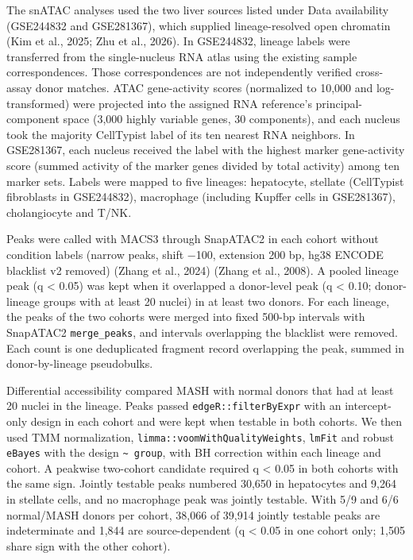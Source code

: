 The snATAC analyses used the two liver sources listed under Data availability (GSE244832 and GSE281367), which supplied lineage-resolved open chromatin (Kim et al., 2025; Zhu et al., 2026). In GSE244832, lineage labels were transferred from the single-nucleus RNA atlas using the existing sample correspondences. Those correspondences are not independently verified cross-assay donor matches. ATAC gene-activity scores (normalized to 10,000 and log-transformed) were projected into the assigned RNA reference's principal-component space (3,000 highly variable genes, 30 components), and each nucleus took the majority CellTypist label of its ten nearest RNA neighbors. In GSE281367, each nucleus received the label with the highest marker gene-activity score (summed activity of the marker genes divided by total activity) among ten marker sets. Labels were mapped to five lineages: hepatocyte, stellate (CellTypist fibroblasts in GSE244832), macrophage (including Kupffer cells in GSE281367), cholangiocyte and T/NK.

Peaks were called with MACS3 through SnapATAC2 in each cohort without condition labels (narrow peaks, shift −100, extension 200 bp, hg38 ENCODE blacklist v2 removed) (Zhang et al., 2024) (Zhang et al., 2008). A pooled lineage peak (q \textless{} 0.05) was kept when it overlapped a donor-level peak (q \textless{} 0.10; donor-lineage groups with at least 20 nuclei) in at least two donors. For each lineage, the peaks of the two cohorts were merged into fixed 500-bp intervals with SnapATAC2 \texttt{merge\_\allowbreak{}peaks}, and intervals overlapping the blacklist were removed. Each count is one deduplicated fragment record overlapping the peak, summed in donor-by-lineage pseudobulks.

Differential accessibility compared MASH with normal donors that had at least 20 nuclei in the lineage. Peaks passed \texttt{edgeR::filterByExpr} with an intercept-only design in each cohort and were kept when testable in both cohorts. We then used TMM normalization, \texttt{limma::voomWithQualityWeights}, \texttt{lmFit} and robust \texttt{eBayes} with the design \texttt{\textasciitilde{}\ group}, with BH correction within each lineage and cohort. A peakwise two-cohort candidate required q \textless{} 0.05 in both cohorts with the same sign. Jointly testable peaks numbered 30,650 in hepatocytes and 9,264 in stellate cells, and no macrophage peak was jointly testable. With 5/9 and 6/6 normal/MASH donors per cohort, 38,066 of 39,914 jointly testable peaks are indeterminate and 1,844 are source-dependent (q \textless{} 0.05 in one cohort only; 1,505 share sign with the other cohort).

